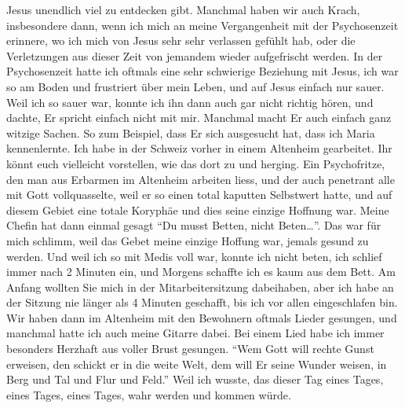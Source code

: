 \documentclass[
]{article}
\begin{document}
Jesus unendlich viel zu entdecken gibt. Manchmal haben wir auch Krach,
insbesondere dann, wenn ich mich an meine Vergangenheit mit der
Psychosenzeit erinnere, wo ich mich von Jesus sehr sehr verlassen
gefühlt hab, oder die Verletzungen aus dieser Zeit von jemandem wieder
aufgefrischt werden. In der Psychosenzeit hatte ich oftmals eine sehr
schwierige Beziehung mit Jesus, ich war so am Boden und frustriert über
mein Leben, und auf Jesus einfach nur sauer. Weil ich so sauer war,
konnte ich ihn dann auch gar nicht richtig hören, und dachte, Er spricht
einfach nicht mit mir. Manchmal macht Er auch einfach ganz witzige
Sachen. So zum Beispiel, dass Er sich ausgesucht hat, dass ich Maria
kennenlernte. Ich habe in der Schweiz vorher in einem Altenheim
gearbeitet. Ihr könnt euch vielleicht vorstellen, wie das dort zu und
herging. Ein Psychofritze, den man aus Erbarmen im Altenheim arbeiten
liess, und der auch penetrant alle mit Gott vollquasselte, weil er so
einen total kaputten Selbstwert hatte, und auf diesem Gebiet eine totale
Koryphäe und dies seine einzige Hoffnung war. Meine Chefin hat dann
einmal gesagt ``Du musst Betten, nicht Beten\ldots{}''. Das war für mich
schlimm, weil das Gebet meine einzige Hoffung war, jemals gesund zu
werden. Und weil ich so mit Medis voll war, konnte ich nicht beten, ich
schlief immer nach 2 Minuten ein, und Morgens schaffte ich es kaum aus
dem Bett. Am Anfang wollten Sie mich in der Mitarbeitersitzung
dabeihaben, aber ich habe an der Sitzung nie länger als 4 Minuten
geschafft, bis ich vor allen eingeschlafen bin. Wir haben dann im
Altenheim mit den Bewohnern oftmals Lieder gesungen, und manchmal hatte
ich auch meine Gitarre dabei. Bei einem Lied habe ich immer besonders
Herzhaft aus voller Brust gesungen. ``Wem Gott will rechte Gunst
erweisen, den schickt er in die weite Welt, dem will Er seine Wunder
weisen, in Berg und Tal und Flur und Feld.'' Weil ich wusste, das dieser
Tag eines Tages, eines Tages, eines Tages, wahr werden und kommen würde.
\end{document}
